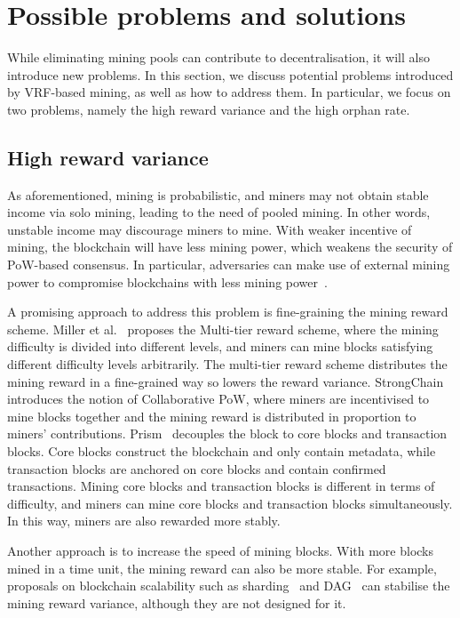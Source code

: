 \section{Possible problems and solutions}
\label{sec:problems-and-solutions}

While eliminating mining pools can contribute to decentralisation, it will also introduce new problems.
In this section, we discuss potential problems introduced by VRF-based mining, as well as how to address them.
In particular, we focus on two problems, namely the high reward variance and the high orphan rate.

\subsection{High reward variance}

As aforementioned, mining is probabilistic, and miners may not obtain stable income via solo mining, leading to the need of pooled mining.
In other words, unstable income may discourage miners to mine.
With weaker incentive of mining, the blockchain will have less mining power, which weakens the security of PoW-based consensus.
In particular, adversaries can make use of external mining power to compromise blockchains with less mining power~\cite{hansucker}.

A promising approach to address this problem is fine-graining the mining reward scheme.
Miller et al.~\cite{miller2015nonoutsourceable} proposes the Multi-tier reward scheme, where the mining difficulty is divided into different levels, and miners can mine blocks satisfying different difficulty levels arbitrarily.
The multi-tier reward scheme distributes the mining reward in a fine-grained way so lowers the reward variance.
StrongChain~\cite{szalachowski2019strongchain} introduces the notion of Collaborative PoW, where miners are incentivised to mine blocks together and the mining reward is distributed in proportion to miners' contributions.
Prism~\cite{bagaria2019prism} decouples the block to core blocks and transaction blocks.
Core blocks construct the blockchain and only contain metadata, while transaction blocks are anchored on core blocks and contain confirmed transactions.
Mining core blocks and transaction blocks is different in terms of difficulty, and miners can mine core blocks and transaction blocks simultaneously.
In this way, miners are also rewarded more stably.

Another approach is to increase the speed of mining blocks.
With more blocks mined in a time unit, the mining reward can also be more stable.
For example, proposals on blockchain scalability such as sharding~\cite{wang2019monoxide} and DAG~\cite{li2018scaling} can stabilise the mining reward variance, although they are not designed for it.





